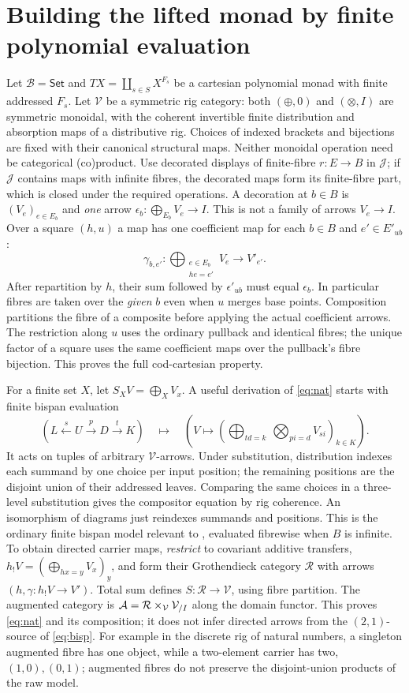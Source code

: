 \documentclass[11pt]{article}
\theoremstyle{definition}\newtheorem{definition}[theorem]{Definition}
\newcommand{\B}{\mathcal B}\newcommand{\J}{\mathcal J}
\newcommand{\V}{\mathcal V}\newcommand{\Set}{\mathsf{Set}}\newcommand{\Cat}{\mathsf{Cat}}
\begin{document}
\section{Building the lifted monad by finite polynomial evaluation}\label{sec:rig}
Let $\B=\Set$ and $TX=\coprod_{s\in S}X^{F_s}$ be a cartesian
polynomial monad with finite addressed $F_s$. Let $\V$ be a symmetric
rig category: both $(\oplus,0)$ and $(\otimes,I)$ are symmetric monoidal,
with the coherent invertible finite distribution and absorption maps
of a distributive rig. Choices of indexed brackets and bijections are
fixed with their canonical structural maps. Neither monoidal operation
need be categorical (co)product. Use decorated displays of finite-fibre
$r:E\to B$ in $\J$; if $\J$ contains maps with infinite fibres,
the decorated maps form its finite-fibre part, which is closed under the
required operations. A decoration at $b\in B$ is $(V_e)_{e\in E_b}$
and \emph{one} arrow $\epsilon_b:\bigoplus_{E_b} V_e\to I$.
This is not a family of arrows $V_e\to I$.
Over a square $(h,u)$ a map has one coefficient map for each
$b\in B$ and $e'\in E'_{u b}$:
\[
 \gamma_{b,e'}:\bigoplus_{\substack{e\in E_b\\ he=e'}}V_e
                      \longrightarrow V'_{e'}.
 \tag{9}\label{eq:nat}
\]
After repartition by $h$, their sum followed by $\epsilon'_{ub}$
must equal $\epsilon_b$. In particular fibres are taken over the
\emph{given} $b$ even when $u$ merges base points. Composition
partitions the fibre of a composite before applying the actual
coefficient arrows. The restriction along $u$ uses the ordinary
pullback and identical fibres; the unique factor of a square uses
the same coefficient maps over the pullback's fibre bijection.
This proves the full cod-cartesian property.

For a finite set $X$, let $S_XV=\bigoplus_X V_x$. A useful derivation
of \eqref{eq:nat} starts with finite bispan evaluation
\[
 (L\xleftarrow{s}U\xrightarrow{p}D\xrightarrow{t}K)
 \quad\mapsto\quad
 \left(V\mapsto
   \left(\bigoplus_{td=k}\ \bigotimes_{p i=d} V_{s i}\right)_{k\in K}\right).
 \tag{10}\label{eq:bisp}
\]
It acts on tuples of arbitrary $\V$-arrows. Under substitution,
distribution indexes each summand by one choice per input position;
the remaining positions are the disjoint union of their addressed
leaves. Comparing the same choices in a three-level substitution gives
the compositor equation by rig coherence. An isomorphism of diagrams
just reindexes summands and positions. This is the ordinary finite
bispan model relevant to \cite[Thm.~A]{CHLL}, evaluated fibrewise
when $B$ is infinite. To obtain directed carrier maps, \emph{restrict}
to covariant additive transfers, $h_!V=(\bigoplus_{hx=y}V_x)_y$,
and form their Grothendieck category $\mathcal R$ with arrows
$(h,\gamma:h_!V\to V')$. Total sum defines
$S:\mathcal R\to\V$, using fibre partition. The augmented category is
$\A=\mathcal R\times_\V \V_{/I}$ along the domain functor.
This proves \eqref{eq:nat} and its composition; it does not infer
directed arrows from the $(2,1)$-source of \eqref{eq:bisp}.
For example in the discrete rig of natural numbers, a singleton
augmented fibre has one object, while a two-element carrier has two,
$(1,0),(0,1)$; augmented fibres do not preserve the disjoint-union
products of the raw model.
\end{document}
